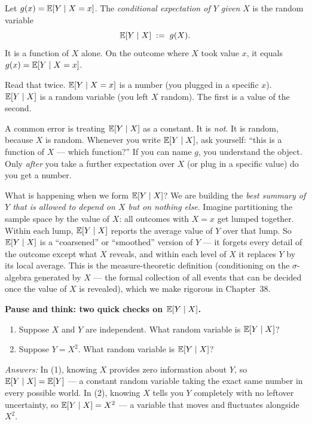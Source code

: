 \begin{definition}
\label{ch15:def-cond-exp-rv}
Let $g(x) = \operatorname{\mathbb{E}}[Y \mid X = x]$. The \emph{conditional expectation of $Y$ given $X$} is the random
variable
\[
  \operatorname{\mathbb{E}}[Y \mid X] \;:=\; g(X).
\]
It is a function of $X$ alone. On the outcome where $X$ took value $x$, it equals $g(x) = \operatorname{\mathbb{E}}[Y\mid X=x]$.
\end{definition}

Read that twice. $\operatorname{\mathbb{E}}[Y \mid X = x]$ is a number (you plugged in a specific $x$). $\operatorname{\mathbb{E}}[Y\mid X]$ is a
random variable (you left $X$ random). The first is a value of the second.

\begin{trapbox}
A common error is treating $\operatorname{\mathbb{E}}[Y \mid X]$ as a constant. It is
\emph{not}. It is random, because $X$ is random. Whenever you write $\operatorname{\mathbb{E}}[Y \mid X]$, ask yourself:
``this is a function of $X$ --- which function?'' If you can name $g$, you understand the object. Only
\emph{after} you take a further expectation over $X$ (or plug in a specific value) do you get a number.
\end{trapbox}

\begin{happeningbox}
What is happening when we form $\operatorname{\mathbb{E}}[Y \mid X]$? We are building the \emph{best summary of $Y$
that is allowed to depend on $X$ but on nothing else}. Imagine partitioning the sample space by the
value of $X$: all outcomes with $X = x$ get lumped together. Within each lump, $\operatorname{\mathbb{E}}[Y\mid X]$ reports
the average value of $Y$ over that lump. So $\operatorname{\mathbb{E}}[Y\mid X]$ is a ``coarsened'' or ``smoothed'' version
of $Y$ --- it forgets every detail of the outcome except what $X$ reveals, and within each level of
$X$ it replaces $Y$ by its local average. This is
the measure-theoretic definition (conditioning on the $\sigma$-algebra generated by $X$ ---
the formal collection of all events that can be decided once the value of $X$ is revealed),
which we make rigorous in Chapter~38.
\end{happeningbox}

\begin{recoverybox}
\textbf{Pause and think: two quick checks on $\operatorname{\mathbb{E}}[Y \mid X]$.}
\begin{enumerate}
  \item Suppose $X$ and $Y$ are independent. What random variable is $\operatorname{\mathbb{E}}[Y \mid X]$?
  \item Suppose $Y = X^2$. What random variable is $\operatorname{\mathbb{E}}[Y \mid X]$?
\end{enumerate}
\emph{Answers:} In (1), knowing $X$ provides zero information about $Y$, so $\operatorname{\mathbb{E}}[Y \mid X] = \operatorname{\mathbb{E}}[Y]$ ---
a constant random variable taking the exact same number in every possible world. In (2), knowing $X$
tells you $Y$ completely with no leftover uncertainty, so $\operatorname{\mathbb{E}}[Y \mid X] = X^2$ --- a variable that
moves and fluctuates alongside $X^2$.
\end{recoverybox}

